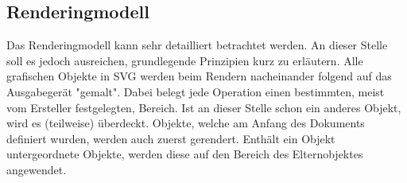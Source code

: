  
\subsection{Renderingmodell}
Das Renderingmodell kann sehr detailliert betrachtet werden. An dieser Stelle soll es jedoch ausreichen, grundlegende Prinzipien kurz zu erläutern.
Alle grafischen Objekte in SVG werden beim Rendern nacheinander folgend auf das Ausgabegerät "gemalt". Dabei belegt jede Operation einen bestimmten, meist vom Ersteller festgelegten, Bereich. Ist an dieser Stelle schon ein anderes Objekt, wird es (teilweise) überdeckt.
Objekte, welche am Anfang des Dokuments definiert wurden, werden auch zuerst gerendert. Enthält ein Objekt untergeordnete Objekte, werden diese auf den Bereich des Elternobjektes angewendet.

\newpage
